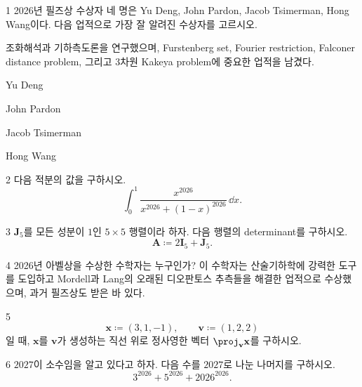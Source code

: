 \documentclass[11pt,oneside]{article}
\begin{document}

\begin{problem}{1}
2026년 필즈상 수상자 네 명은 Yu Deng, John Pardon, Jacob Tsimerman, Hong Wang이다. 다음 업적으로 가장 잘 알려진 수상자를 고르시오.

조화해석과 기하측도론을 연구했으며, Furstenberg set, Fourier restriction, Falconer distance problem, 그리고 3차원 Kakeya problem에 중요한 업적을 남겼다.

\begin{problemchoices}
    \item Yu Deng
    \item John Pardon
    \item Jacob Tsimerman
    \item Hong Wang
\end{problemchoices}
\end{problem}

\begin{problem}{2}
다음 적분의 값을 구하시오.
\[
    \int_0^1
    \frac{x^{2026}}{x^{2026}+(1-x)^{2026}}
    \,\dd x.
\]
\end{problem}

\begin{problem}{3}
$\mathbf{J}_5$를 모든 성분이 $1$인 $5\times5$ 행렬이라 하자. 다음 행렬의 determinant를 구하시오.
\[
    \mathbf{A}\coloneqq 2\mathbf{I}_5+\mathbf{J}_5.
\]
\end{problem}

\begin{problem}{4}
2026년 아벨상을 수상한 수학자는 누구인가? 이 수학자는 산술기하학에 강력한 도구를 도입하고 Mordell과 Lang의 오래된 디오판토스 추측들을 해결한 업적으로 수상했으며, 과거 필즈상도 받은 바 있다.
\end{problem}

\begin{problem}{5}
\[
    \mathbf{x}\coloneqq (3,1,-1),
    \qquad
    \mathbf{v}\coloneqq (1,2,2)
\]
일 때, $\mathbf{x}$를 $\mathbf{v}$가 생성하는 직선 위로 정사영한 벡터 $\proj_{\mathbf{v}}\mathbf{x}$를 구하시오.
\end{problem}

\begin{problem}{6}
$2027$이 소수임을 알고 있다고 하자. 다음 수를 $2027$로 나눈 나머지를 구하시오.
\[
    3^{2026}+5^{2026}+2026^{2026}.
\]
\end{problem}
\end{document}
